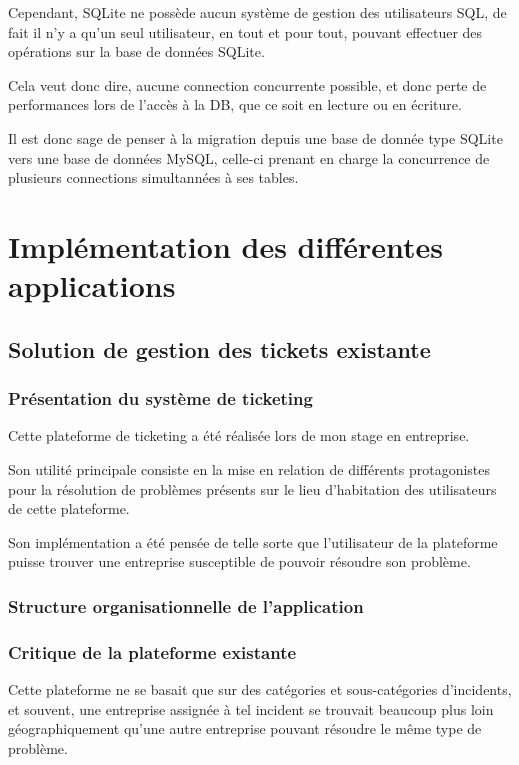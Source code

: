 \documentclass[12pt,table,a4paper]{report}
\begin{document}
Cependant, SQLite ne possède aucun système de gestion des utilisateurs SQL, de fait il n'y a qu'un seul utilisateur, en tout et pour tout, pouvant effectuer des opérations sur la base de données SQLite.

Cela veut donc dire, aucune connection concurrente possible, et donc perte de performances lors de l'accès à la DB, que ce soit en lecture ou en écriture.

Il est donc sage de penser à la migration depuis une base de donnée type SQLite vers une base de données MySQL, celle-ci prenant en charge la concurrence de plusieurs connections simultannées à ses tables.


\chapter{Implémentation des différentes applications}

\section{Solution de gestion des tickets existante}

\subsection{Présentation du système de ticketing}
Cette plateforme de ticketing a été réalisée lors de mon stage en entreprise.

Son utilité principale consiste en la mise en relation de différents protagonistes pour la résolution de problèmes présents sur le lieu d'habitation des utilisateurs de cette plateforme.

Son implémentation a été pensée de telle sorte que l'utilisateur de la plateforme puisse trouver une entreprise susceptible de pouvoir résoudre son problème.

\subsection{Structure organisationnelle de l'application}

\subsection{Critique de la plateforme existante}
Cette plateforme ne se basait que sur des catégories et sous-catégories d'incidents, et souvent, une entreprise assignée à tel incident se trouvait beaucoup plus loin géographiquement qu'une autre entreprise pouvant résoudre le même type de problème.
\end{document}
